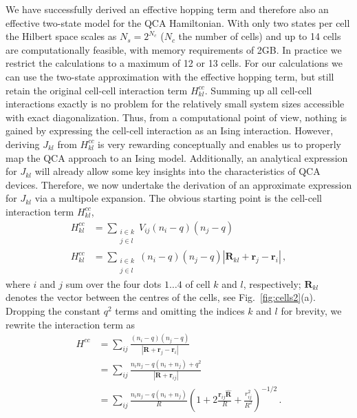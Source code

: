 We have successfully derived an effective hopping term and therefore also an
effective two-state model for the QCA Hamiltonian. With only two states per cell
the Hilbert space scales as $N_s = 2^{N_c}$ ($N_c$ the number of cells) and up
to 14 cells are computationally feasible, with memory requirements of 2GB. In
practice we restrict the calculations to a maximum of 12 or 13 cells. For our
calculations we can use the two-state approximation with the effective hopping
term, but still retain the original cell-cell interaction term $H^{cc}_{kl}$.
Summing up all cell-cell interactions exactly is no problem for the relatively
small system sizes accessible with exact diagonalization.  Thus, from a
computational point of view, nothing is gained by expressing the cell-cell
interaction as an Ising interaction. However, deriving $J_{kl}$ from
$H^{cc}_{kl}$ is very rewarding conceptually and enables us to properly map the
QCA approach to an Ising model. Additionally, an analytical expression for
$J_{kl}$ will already allow some key insights into the characteristics of QCA
devices. Therefore, we now undertake the derivation of an approximate expression
for $J_{kl}$ via a multipole expansion. The obvious starting point is the
cell-cell interaction term $H^{cc}_{kl}$, 
%
\begin{equation}
\begin{split}
  H^{cc}_{kl} 
  &=
  \sum_{\substack{i \in k\\j \in l}} V_{ij} \left( n_i - q \right) \left( n_j - q \right) \\
  H^{cc}_{kl}
  &= 
  \sum_{\substack{i \in k\\j \in l}} \left( n_i - q \right) \left( n_j - q \right)
  {\left| \bm{R}_{kl} + \bm{r}_j - \bm{r}_i \right|} \, ,
\end{split}
\end{equation}
%
where $i$ and $j$ sum over the four dots $1\ldots4$ of cell $k$ and $l$,
respectively; $\bm{R}_{kl}$ denotes the vector between the centres of the cells,
see Fig.~\ref{fig:cells2}(a). Dropping the constant $q^2$ terms and omitting
the indices $k$ and $l$ for brevity, we rewrite the interaction term as
%
\begin{equation}
\begin{split}
  H^{cc}
  &= 
  \sum_{ij} \frac{(n_i-q) (n_j-q)}
  {\left| \bm{R} + \bm{r}_j - \bm{r}_i \right|} \\
  &=
  \sum_{ij} \frac{n_i n_j - q (n_i + n_j) + q^2}
  {\left| \bm{R} + \bm{r}_{ij} \right|} \\
  &=
  \sum_{ij} \frac{n_i n_j - q (n_i + n_j)}{R}
  \left( 
  1 + 2 \frac{\bm{r}_{ij} \hat{\bm{R}}}{R} + \frac{r_{ij}^2}{R^2}
  \right)^{-1/2} \, .
\end{split}
\end{equation}
